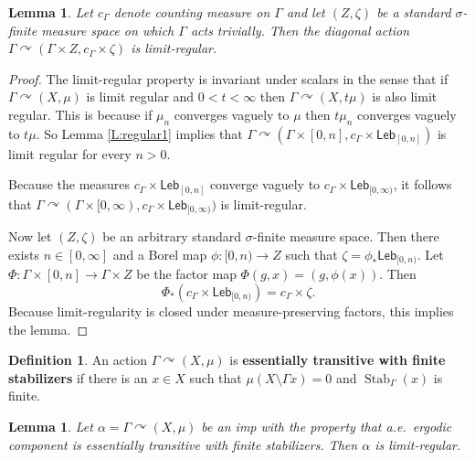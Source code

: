 \documentclass[12pt]{article}
\theoremstyle{plain}
\newtheorem{lem}[thm]{Lemma}
\theoremstyle{definition}
\newtheorem{defn}{Definition}
\theoremstyle{remark}
\newcommand{\G}{\Gamma}
\renewcommand\a{\alpha}
\newcommand\s{\sigma}
\newcommand\Stab{\operatorname{Stab}}
\def\cc{{\curvearrowright}}
\begin{document}
\begin{lem}\label{L:regular2}
    Let $c_\G$ denote counting measure on $\G$ and let $(Z,\zeta)$ be a standard $\s$-finite measure space on which $\G$ acts trivially.  Then the diagonal action $\G \cc (\G\times Z, c_\G \times \zeta)$ is limit-regular.
\end{lem}

\begin{proof}
The limit-regular property is invariant under scalars in the sense that if $\G \cc (X,\mu)$ is limit regular and $0<t<\infty$ then $\G \cc (X,t\mu)$ is also limit regular. This is because if $\mu_n$ converges vaguely to $\mu$ then $t\mu_n$ converges vaguely to $t\mu$. So Lemma \ref{L:regular1} implies that $\G \cc (\G\times [0,n], c_\G \times \mathsf{Leb}_{[0,n]})$ is limit regular for every $n>0$. 

 Because the measures $c_\G\times \mathsf{Leb}_{[0,n]}$ converge vaguely to $c_\G\times \mathsf{Leb}_{[0,\infty)}$, it follows that $\G \cc (\G\times [0,\infty), c_\G\times \mathsf{Leb}_{[0,\infty)})$ is limit-regular. 
 
Now let $(Z,\zeta)$ be an arbitrary standard $\sigma$-finite measure space. Then there exists $n\in [0,\infty]$ and a Borel map $\phi:[0,n) \to Z$ such that $\zeta = \phi_*\mathsf{Leb}_{[0,n)}$. Let $\Phi:\G \times [0,n] \to \G \times Z$ be the factor map $\Phi(g,x)=(g,\phi(x))$. Then $$\Phi_*(c_\G\times \mathsf{Leb}_{[0,n)})=c_\G\times\zeta.$$
Because limit-regularity is closed under measure-preserving factors, this implies the lemma. 
\end{proof}





\begin{defn}
    An action $\G \cc (X,\mu)$ is {\bf essentially transitive with finite stabilizers} if there is an $x\in X$ such that $\mu(X \setminus \G x)=0$ and $\Stab_\G(x)$ is finite.
\end{defn}

\begin{lem}\label{L:regular3}
    Let $\a=\G \cc (X,\mu)$ be an imp with the property that a.e.\ ergodic component is essentially transitive with finite stabilizers. Then $\a$ is limit-regular.
\end{lem}
\end{document}

